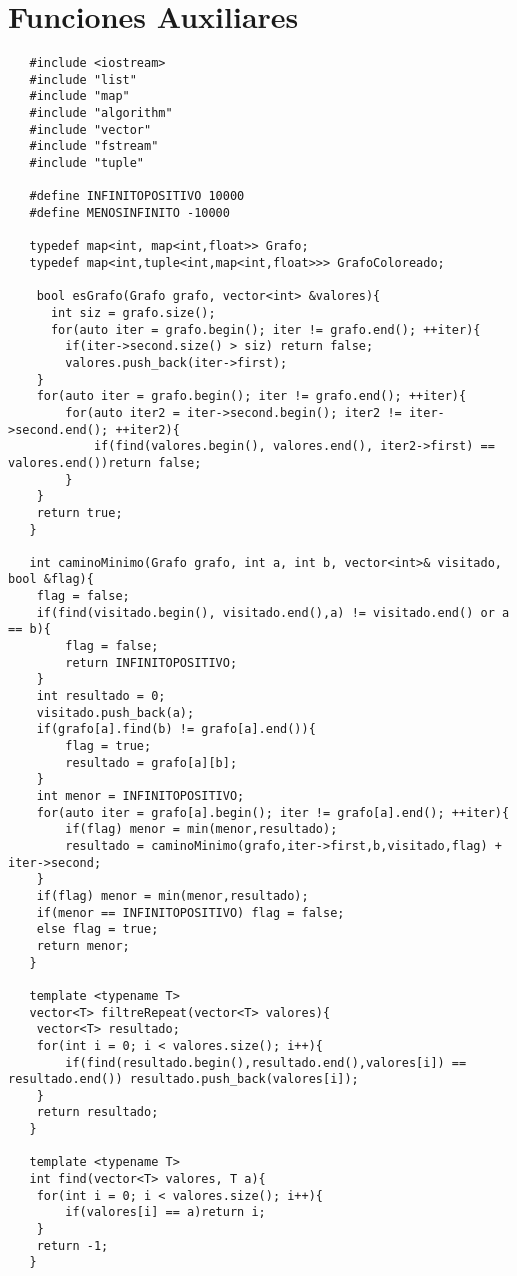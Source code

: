 \documentclass[a4paper,12pt]{article}
\begin{document}
  \section{Funciones Auxiliares}
  \begin{lstlisting}
   #include <iostream>
   #include "list"
   #include "map"
   #include "algorithm"
   #include "vector"
   #include "fstream"
   #include "tuple"

   #define INFINITOPOSITIVO 10000
   #define MENOSINFINITO -10000
  
   typedef map<int, map<int,float>> Grafo;
   typedef map<int,tuple<int,map<int,float>>> GrafoColoreado;
   
    bool esGrafo(Grafo grafo, vector<int> &valores){
      int siz = grafo.size();
      for(auto iter = grafo.begin(); iter != grafo.end(); ++iter){
        if(iter->second.size() > siz) return false;
        valores.push_back(iter->first);
    }
    for(auto iter = grafo.begin(); iter != grafo.end(); ++iter){
        for(auto iter2 = iter->second.begin(); iter2 != iter->second.end(); ++iter2){
            if(find(valores.begin(), valores.end(), iter2->first) == valores.end())return false;
        }
    }
    return true;
   }
   
   int caminoMinimo(Grafo grafo, int a, int b, vector<int>& visitado, bool &flag){
    flag = false;
    if(find(visitado.begin(), visitado.end(),a) != visitado.end() or a == b){
        flag = false;
        return INFINITOPOSITIVO;
    }
    int resultado = 0;
    visitado.push_back(a);
    if(grafo[a].find(b) != grafo[a].end()){
        flag = true;
        resultado = grafo[a][b];
    }
    int menor = INFINITOPOSITIVO;
    for(auto iter = grafo[a].begin(); iter != grafo[a].end(); ++iter){
        if(flag) menor = min(menor,resultado);
        resultado = caminoMinimo(grafo,iter->first,b,visitado,flag) + iter->second;
    }
    if(flag) menor = min(menor,resultado);
    if(menor == INFINITOPOSITIVO) flag = false;
    else flag = true;
    return menor;
   }
   
   template <typename T>
   vector<T> filtreRepeat(vector<T> valores){
    vector<T> resultado;
    for(int i = 0; i < valores.size(); i++){
        if(find(resultado.begin(),resultado.end(),valores[i]) == resultado.end()) resultado.push_back(valores[i]);
    }
    return resultado;
   }
   
   template <typename T>
   int find(vector<T> valores, T a){ 
    for(int i = 0; i < valores.size(); i++){
        if(valores[i] == a)return i;
    }
    return -1;
   }
   
  \end{lstlisting}
\end{document}
